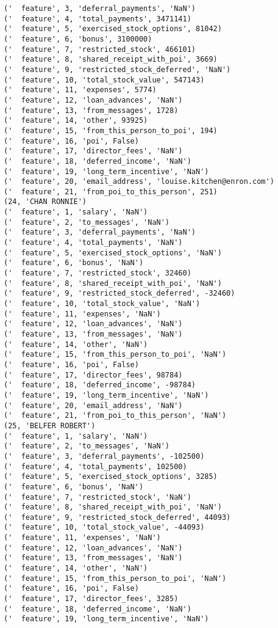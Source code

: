 \begin{verbatim}
('  feature', 3, 'deferral_payments', 'NaN')
('  feature', 4, 'total_payments', 3471141)
('  feature', 5, 'exercised_stock_options', 81042)
('  feature', 6, 'bonus', 3100000)
('  feature', 7, 'restricted_stock', 466101)
('  feature', 8, 'shared_receipt_with_poi', 3669)
('  feature', 9, 'restricted_stock_deferred', 'NaN')
('  feature', 10, 'total_stock_value', 547143)
('  feature', 11, 'expenses', 5774)
('  feature', 12, 'loan_advances', 'NaN')
('  feature', 13, 'from_messages', 1728)
('  feature', 14, 'other', 93925)
('  feature', 15, 'from_this_person_to_poi', 194)
('  feature', 16, 'poi', False)
('  feature', 17, 'director_fees', 'NaN')
('  feature', 18, 'deferred_income', 'NaN')
('  feature', 19, 'long_term_incentive', 'NaN')
('  feature', 20, 'email_address', 'louise.kitchen@enron.com')
('  feature', 21, 'from_poi_to_this_person', 251)
(24, 'CHAN RONNIE')
('  feature', 1, 'salary', 'NaN')
('  feature', 2, 'to_messages', 'NaN')
('  feature', 3, 'deferral_payments', 'NaN')
('  feature', 4, 'total_payments', 'NaN')
('  feature', 5, 'exercised_stock_options', 'NaN')
('  feature', 6, 'bonus', 'NaN')
('  feature', 7, 'restricted_stock', 32460)
('  feature', 8, 'shared_receipt_with_poi', 'NaN')
('  feature', 9, 'restricted_stock_deferred', -32460)
('  feature', 10, 'total_stock_value', 'NaN')
('  feature', 11, 'expenses', 'NaN')
('  feature', 12, 'loan_advances', 'NaN')
('  feature', 13, 'from_messages', 'NaN')
('  feature', 14, 'other', 'NaN')
('  feature', 15, 'from_this_person_to_poi', 'NaN')
('  feature', 16, 'poi', False)
('  feature', 17, 'director_fees', 98784)
('  feature', 18, 'deferred_income', -98784)
('  feature', 19, 'long_term_incentive', 'NaN')
('  feature', 20, 'email_address', 'NaN')
('  feature', 21, 'from_poi_to_this_person', 'NaN')
(25, 'BELFER ROBERT')
('  feature', 1, 'salary', 'NaN')
('  feature', 2, 'to_messages', 'NaN')
('  feature', 3, 'deferral_payments', -102500)
('  feature', 4, 'total_payments', 102500)
('  feature', 5, 'exercised_stock_options', 3285)
('  feature', 6, 'bonus', 'NaN')
('  feature', 7, 'restricted_stock', 'NaN')
('  feature', 8, 'shared_receipt_with_poi', 'NaN')
('  feature', 9, 'restricted_stock_deferred', 44093)
('  feature', 10, 'total_stock_value', -44093)
('  feature', 11, 'expenses', 'NaN')
('  feature', 12, 'loan_advances', 'NaN')
('  feature', 13, 'from_messages', 'NaN')
('  feature', 14, 'other', 'NaN')
('  feature', 15, 'from_this_person_to_poi', 'NaN')
('  feature', 16, 'poi', False)
('  feature', 17, 'director_fees', 3285)
('  feature', 18, 'deferred_income', 'NaN')
('  feature', 19, 'long_term_incentive', 'NaN')

\end{verbatim}
